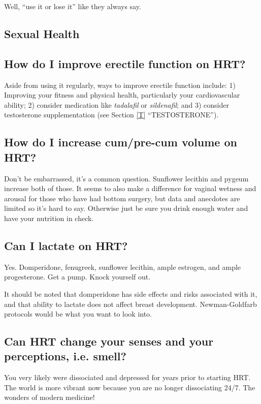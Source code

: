 \documentclass{article}
\begin{document}
Well, “use it or lose it” like they always say.

\subsection*{Sexual Health}

\subsection{How do I improve erectile function on HRT?}

Aside from using it regularly, ways to improve erectile function include: 1) Improving your fitness and physical health, particularly your cardiovascular ability; 2) consider medication like \textit{tadalafil} or \textit{sildenafil}; and 3) consider testosterone supplementation (see Section \ref{T} “TESTOSTERONE”).

\subsection{How do I increase cum/pre-cum volume on HRT?}

Don’t be embarrassed, it’s a common question. Sunflower lecithin and pygeum increase both of those. It seems to also make a difference for vaginal wetness and arousal for those who have had bottom surgery, but data and anecdotes are limited so it’s hard to say. Otherwise just be sure you drink enough water and have your nutrition in check.

\subsection{Can I lactate on HRT?}

Yes. Domperidone, fenugreek, sunflower lecithin, ample estrogen, and ample progesterone. Get a pump. Knock yourself out.

It should be noted that domperidone has side effects and risks associated with it, and that ability to lactate does not affect breast development. Newman-Goldfarb protocols would be what you want to look into.

\subsection{Can HRT change your senses and your perceptions, i.e. smell?}

You very likely were dissociated and depressed for years prior to starting HRT. The world is more vibrant now because you are no longer dissociating 24/7. The wonders of modern medicine!
\end{document}
